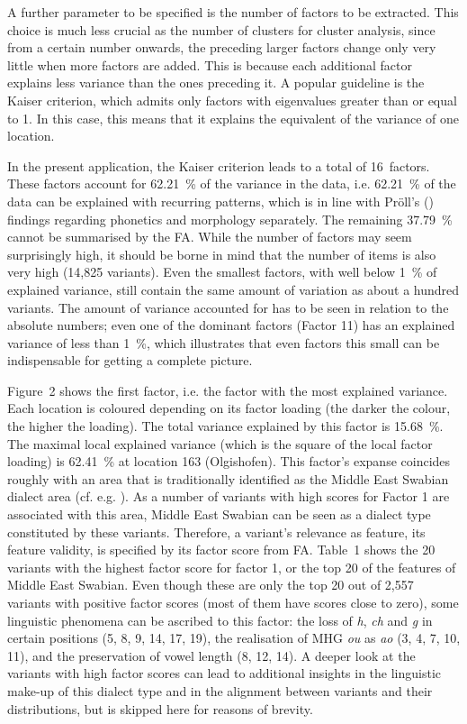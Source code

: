 \documentclass[output=paper]{LSP/langsci}
\begin{document}
A further parameter to be specified is the number of factors to be extracted. This choice is much less crucial as the number of clusters for cluster analysis, since from a certain number onwards, the preceding larger factors change only very little when more factors are added. This is because each additional factor explains less variance than the ones preceding it. A popular guideline is the Kaiser criterion, which admits only factors with eigenvalues greater than or equal to 1. In this case, this means that it explains the equivalent of the variance of one location.

In the present application, the Kaiser criterion leads to a total of 16~factors. These factors account for 62.21~\% of the variance in the data, i.e. 62.21~\% of the data can be explained with recurring patterns, which is in line with Pröll’s (\citeyear{proll_raumvariation_2015}) findings regarding phonetics and morphology separately. The remaining 37.79~\% cannot be summarised by the FA. While the number of factors may seem surprisingly high, it should be borne in mind that the number of items is also very high (14,825 variants). Even the smallest factors, with well below 1~\% of explained variance, still contain the same amount of variation as about a hundred variants. The amount of variance accounted for has to be seen in relation to the absolute numbers; even one of the dominant factors (Factor 11) has an explained variance of less than 1~\%, which illustrates that even factors this small can be indispensable for getting a complete picture. 

Figure~2 shows the first factor, i.e. the factor with the most explained variance. Each location is coloured depending on its factor loading (the darker the colour, the higher the loading). The total variance explained by this factor is 15.68~\%. The maximal local explained variance (which is the square of the local factor loading) is 62.41~\% at location 163 (Olgishofen). This factor’s expanse coincides roughly with an area that is traditionally identified as the Middle East Swabian dialect area (cf. e.g. \citealt[118]{nubling_studien_1988}). As a number of variants with high scores for Factor 1 are associated with this area, Middle East Swabian can be seen as a dialect type constituted by these variants. Therefore, a variant’s relevance as feature, its feature validity, is specified by its factor score from FA. Table~1 shows the 20 variants with the highest factor score for factor 1, or the top 20 of the features of Middle East Swabian. Even though these are only the top 20 out of 2,557 variants with positive factor scores (most of them have scores close to zero), some linguistic phenomena can be ascribed to this factor: the loss of \textit{h}, \textit{ch} and \textit{g} in certain positions (5, 8, 9, 14, 17, 19), the realisation of MHG \textit{ou} as \textit{ao} (3, 4, 7, 10, 11), and the preservation of vowel length (8, 12, 14). A deeper look at the variants with high factor scores can lead to additional insights in the linguistic make-up of this dialect type and in the alignment between variants and their distributions, but is skipped here for reasons of brevity. 
\end{document}
